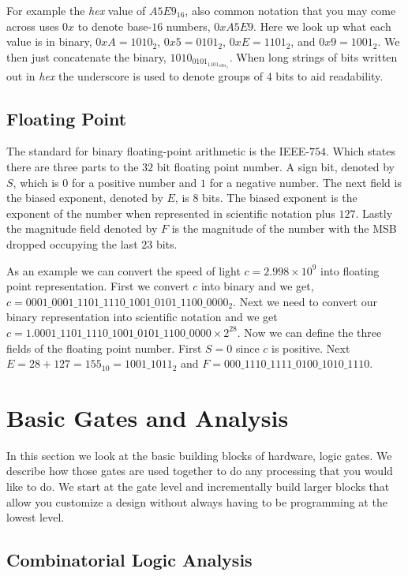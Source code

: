 For example the \emph{hex} value of $A5E9_{16}$, also common notation that you may come across uses $0x$ to denote base-$16$ numbers, $0xA5E9$. Here we look up what each value is in binary, $0xA=1010_2$, $0x5=0101_2$, $0xE=1101_2$, and $0x9=1001_2$. We then just concatenate the binary, $1010_0101_1101_1001_2$. When long strings of bits written out in \emph{hex} the underscore is used to denote groups of $4$ bits to aid readability.	
		
\subsection{Floating Point}
	
The standard for binary floating-point arithmetic is the \ac{IEEE}-$754$. Which states there are three parts to the $32$ bit floating point number. A sign bit, denoted by $S$, which is $0$ for a positive number and $1$ for a negative number. The next field is the biased exponent, denoted by $E$, is $8$ bits. The biased exponent is the exponent of the number when represented in scientific notation plus $127$. Lastly the magnitude field denoted by $F$ is the magnitude of the number with the \ac{MSB} dropped occupying the last $23$ bits.

As an example we can convert the speed of light $c = 2.998 \times 10^9$ into floating point representation. First we convert $c$ into binary and we get, $c=0001\_0001\_1101\_1110\_1001\_0101\_1100\_0000_2$. Next we need to convert our binary representation into scientific notation and we get $c=1.0001\_1101\_1110\_1001\_0101\_1100\_0000 \times 2^{28}$. Now we can define the three fields of the floating point number. First $S=0$ since $c$ is positive. Next $E=28+127=155_{10}=1001\_1011_2$ and $F=000\_1110\_1111\_0100\_1010\_1110$.


\section{Basic Gates and Analysis}
In this section we look at the basic building blocks of hardware, logic gates. We describe how those gates are used together to do any processing that you would like to do. We start at the gate level and incrementally build larger blocks that allow you customize a design without always having to be programming at the lowest level.

\subsection{Combinatorial Logic Analysis}

